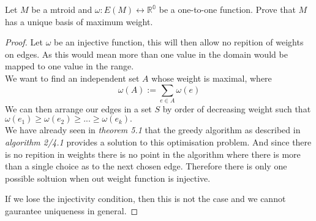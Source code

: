 \documentclass[../main.tex]{subfiles}
\begin{document}
\begin{lem}
Let $M$ be a mtroid and $\omega: E(M) \longleftrightarrow \mathbb{R^0}$ be a one-to-one function. Prove that $M$ has a unique basis of maximum weight.
\end{lem}
\begin{proof}
Let $\omega$ be an injective function, this will then allow no repition of weights on edges. As this would mean more than one value in the domain would be mapped to one value in the range.\\
We want to find an independent set $A$ whose weight is maximal, where
\begin{equation}
\omega(A) := \sum_{e \in A} \omega (e)
\end{equation}
We can then arrange our edges in a set $S$ by order of decreasing weight such that $\omega(e_1) \geq \omega(e_2) \geq ... \geq \omega(e_k).$\\
We have already seen in \textit{theorem 5.1} that the greedy algorithm as described in \textit{algorithm 2/4.1} provides a solution to this optimisation problem. And since there is no repition in weights there is no point in the algorithm where there is more than a single choice as to the next chosen edge. Therefore there is only one possible soltuion when out weight function is injective.

\vspace{3mm}

If we lose the injectivity condition, then this is not the case and we cannot gaurantee uniqueness in general.
\end{proof}
\end{document}
